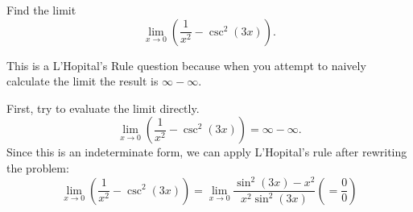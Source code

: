 \documentclass{ximera}
\author{Emma Smith Zbarsky}
\begin{document}
\begin{exercise}

Find the limit \[\lim_{x \to 0} \left(\frac{1}{x^2}- \csc^2(3x)\right).\]


\begin{hint}
This is a L'Hopital's Rule question because when you attempt to naively
calculate the limit the result is $\infty-\infty$.
\end{hint}


\begin{hint}
First, try to evaluate the limit directly.
\[\lim_{x\to 0} \left(\frac{1}{x^2} - \csc^2(3x)\right) = \infty-\infty.\] Since this
is an indeterminate form, we can apply L'Hopital's rule after rewriting
the problem: \[
\lim_{x\to 0} \left(\frac{1}{x^2}-\csc^2(3x) \right)= \lim_{x\to 0} \frac{\sin^2(3x)-x^2}{x^2\sin^2(3x)} \left( = \frac{0}{0}\right)
\] 
\end{hint}


\begin{multipleChoice}
\choice{$-\infty$}
\choice[correct]{$\infty$}
\end{multipleChoice}

\end{exercise}
\end{document}
